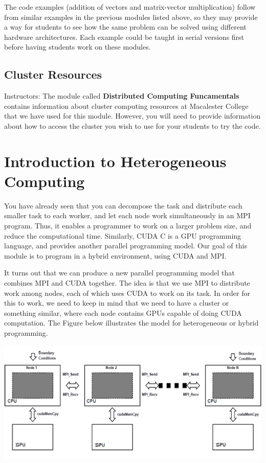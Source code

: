 \documentclass[letterpaper,10pt,openany,oneside]{sphinxmanual}
\begin{document}
The code examples (addition of vectors and matrix-vector multiplication) follow from similar examples in the previous modules listed above, so they may provide a way for students to see how the same problem can be solved using different hardware architectures.  Each example could be taught in serial versions first before having students work on these modules.


\section{Cluster Resources}
\label{Prerequisites/Prerequisites:cluster-resources}
Instructors: The module called \textbf{Distributed Computing Funcamentals} contains information about cluster computing resources at Macalester College that we have used for this module.  However, you will need to provide information about how to access the cluster you wish to use for your students to try the code.


\chapter{Introduction to Heterogeneous Computing}
\label{IntroHeterogeneous/IntroHeterogeneous::doc}\label{IntroHeterogeneous/IntroHeterogeneous:introduction-to-heterogeneous-computing}
You have already seen that you can decompose the task and distribute each smaller task to each worker, and let each node work simultaneously in an MPI program. Thus, it enables a programmer to work on a larger problem size, and reduce the computational time. Similarly, CUDA C is a GPU programming language, and provides another parallel programming model. Our goal of this module is to program in a hybrid environment, using CUDA and MPI.

It turns out that we can produce a new parallel programming model that combines MPI and CUDA together. The idea is that we use MPI to distribute work among nodes, each of which uses CUDA to work on its task. In order for this to work, we need to keep in mind that we need to have a cluster or something similar, where each node contains GPUs capable of doing CUDA computation. The Figure below illustrates the model for heterogeneous or hybrid programming.

{\hfill\includegraphics{cudampi.png}\hfill}
\end{document}
